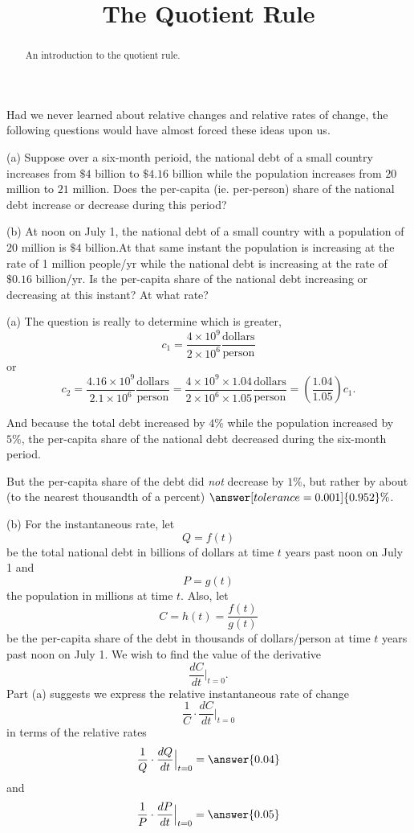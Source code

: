 \documentclass{ximera}
\title{The Quotient Rule}
\begin{document}
\begin{abstract}
An introduction to the quotient rule.
\end{abstract}
\maketitle


Had we never learned about relative changes and relative rates of change, the following questions would have almost forced these ideas upon us.

\begin{question} \label{Ex:Dfggt4ttggg}
(a) Suppose over a six-month perioid, the national debt of a small country increases from $\$4$ billion to $\$4.16$ billion while the population increases from $20$ million to $21$ million. Does the per-capita (ie. per-person) share of the national debt increase or decrease during this period? 

(b) At noon on July 1, the national debt of a small country with a population of $20$ million is $\$4$ billion.At that same instant the population is increasing at the rate of 1 million people/yr while the national debt is increasing at the rate of $\$0.16$ billion/yr. Is the per-capita share of the national debt increasing or decreasing at this instant? At what rate?

\begin{explanation}
(a) The question is really to determine which is greater, 
\[
       c_1 =  \frac{4 \times 10^9}{2 \times 10^6} \frac{\text{dollars}}{\text{person}}
\]
or
\[
      c_2 =   \frac{4.16 \times 10^9}{2.1 \times 10^6} \frac{\text{dollars}}{\text{person}} = \frac{4 \times 10^9 \times 1.04}{2 \times 10^6\times 1.05} \frac{\text{dollars}}{\text{person}} = \left( \frac{1.04}{1.05} \right)c_1 .
\]

And because the total debt increased by $4\%$ while the population increased by $5\%$, the per-capita share of the national debt decreased during the six-month period.

But the per-capita share of the debt did \emph{not} decrease by $1\%$, but rather by about (to the nearest thousandth of a percent) $\answer[tolerance=0.001]{0.952}\%$.

(b) For the instantaneous rate, let
\[
         Q = f(t)
\]
be the total national debt in billions of dollars at time $t$ years past noon on July 1 and
\[
     P = g(t)
\]
the population in millions at time $t$. Also, let
\[
       C = h(t) = \frac{f(t)}{g(t)}
\]
be the per-capita share of the debt in thousands of dollars/person at time $t$ years past noon on July 1. We wish to find the value of the derivative
\[
      \frac{dC}{dt} \Big|_{t=0} .
\]
Part (a) suggests we express the relative instantaneous rate of change
\[
     \frac{1}{C} \cdot \frac{dC}{dt} \Big|_{t=0}
\]
in terms of the relative rates
\[
    \frac{1}{Q} \cdot \frac{dQ}{dt}\Big|_{t=0} = \answer{0.04} 
\]
and
\[
   \frac{1}{P} \cdot \frac{dP}{dt}\Big|_{t=0} = \answer{0.05}
\]


\end{explanation}
\end{question}
\end{document}
